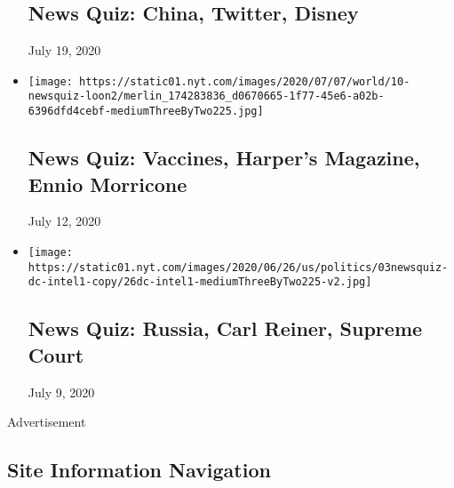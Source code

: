 \begin{itemize}
  \hypertarget{news-quiz-china-twitter-disney}{%
  \subsection{News Quiz: China, Twitter,
  Disney}\label{news-quiz-china-twitter-disney}}

  July 19, 2020
\item
  \href{https://www.nytimes.com/interactive/2020/07/10/briefing/vaccines-harpers-magazine-ennio-morricone-news-quiz.html}{}

  \texttt{[image: https://static01.nyt.com/images/2020/07/07/world/10-newsquiz-loon2/merlin\_174283836\_d0670665-1f77-45e6-a02b-6396dfd4cebf-mediumThreeByTwo225.jpg]}

  \hypertarget{news-quiz-vaccines-harpers-magazine-ennio-morricone}{%
  \subsection{News Quiz: Vaccines, Harper's Magazine, Ennio
  Morricone}\label{news-quiz-vaccines-harpers-magazine-ennio-morricone}}

  July 12, 2020
\item
  \href{https://www.nytimes.com/interactive/2020/07/03/briefing/russia-carl-reiner-supreme-court-news-quiz.html}{}

  \texttt{[image: https://static01.nyt.com/images/2020/06/26/us/politics/03newsquiz-dc-intel1-copy/26dc-intel1-mediumThreeByTwo225-v2.jpg]}

  \hypertarget{news-quiz-russia-carl-reiner-supreme-court}{%
  \subsection{News Quiz: Russia, Carl Reiner, Supreme
  Court}\label{news-quiz-russia-carl-reiner-supreme-court}}

  July 9, 2020
\end{itemize}

Advertisement

\hypertarget{site-information-navigation}{%
\subsection{Site Information
Navigation}\label{site-information-navigation}}

